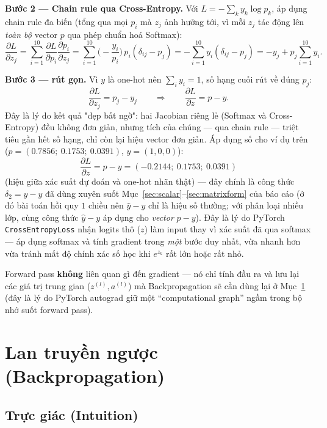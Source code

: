 \documentclass[12pt,a4paper]{article}
\begin{document}
\textbf{Bước 2 --- Chain rule qua Cross-Entropy.} Với
$L=-\sum_k y_k\log p_k$, áp dụng chain rule đa biến (tổng qua mọi $p_i$ mà
$z_j$ ảnh hưởng tới, vì mỗi $z_j$ tác động lên \emph{toàn bộ} vector $p$
qua phép chuẩn hoá Softmax):
$$\frac{\partial L}{\partial z_j} = \sum_{i=1}^{10}\frac{\partial L}{\partial p_i}\frac{\partial p_i}{\partial z_j}
= \sum_{i=1}^{10}\Big(-\frac{y_i}{p_i}\Big)\,p_i(\delta_{ij}-p_j)
= -\sum_{i=1}^{10} y_i(\delta_{ij}-p_j)
= -y_j + p_j\sum_{i=1}^{10}y_i.$$

\textbf{Bước 3 --- rút gọn.} Vì $y$ là one-hot nên $\sum_i y_i=1$, số hạng
cuối rút về đúng $p_j$:
$$\boxed{\frac{\partial L}{\partial z_j} = p_j - y_j} \qquad\Longrightarrow\qquad \frac{\partial L}{\partial z} = p - y.$$
Đây là lý do kết quả "đẹp bất ngờ": hai Jacobian riêng lẻ (Softmax và
Cross-Entropy) đều không đơn giản, nhưng tích của chúng --- qua chain rule
--- triệt tiêu gần hết số hạng, chỉ còn lại hiệu vector đơn giản. Áp dụng
số cho ví dụ trên ($p=(0.7856;\ 0.1753;\ 0.0391)$, $y=(1,0,0)$):
$$\frac{\partial L}{\partial z} = p - y = (-0.2144;\ 0.1753;\ 0.0391)$$
(hiệu giữa xác suất dự đoán và one-hot nhãn thật) --- đây chính là công
thức $\delta_2=\hat y-y$ đã dùng xuyên suốt Mục~\ref{sec:scalar}--\ref{sec:matrixform}
của báo cáo (ở đó bài toán hồi quy $1$ chiều nên $\hat y-y$ chỉ là hiệu
số thường; với phân loại nhiều lớp, cùng công thức $\hat y-y$ áp dụng cho
\emph{vector} $p-y$). Đây là lý do PyTorch \texttt{CrossEntropyLoss} nhận
logits thô ($z$) làm input thay vì xác suất đã qua softmax --- áp dụng
softmax và tính gradient trong \emph{một} bước duy nhất, vừa nhanh hơn
vừa tránh mất độ chính xác số học khi $e^{z_k}$ rất lớn hoặc rất nhỏ.

Forward pass \textbf{không} liên quan gì đến gradient --- nó chỉ tính đầu
ra và lưu lại các giá trị trung gian ($z^{(l)}, a^{(l)}$) mà Backpropagation
sẽ cần dùng lại ở Mục~\ref{sec:backprop} (đây là lý do PyTorch autograd giữ
một ``computational graph'' ngầm trong bộ nhớ suốt forward pass).

\section{Lan truyền ngược (Backpropagation)}
\label{sec:backprop}

\subsection{Trực giác (Intuition)}
\end{document}
